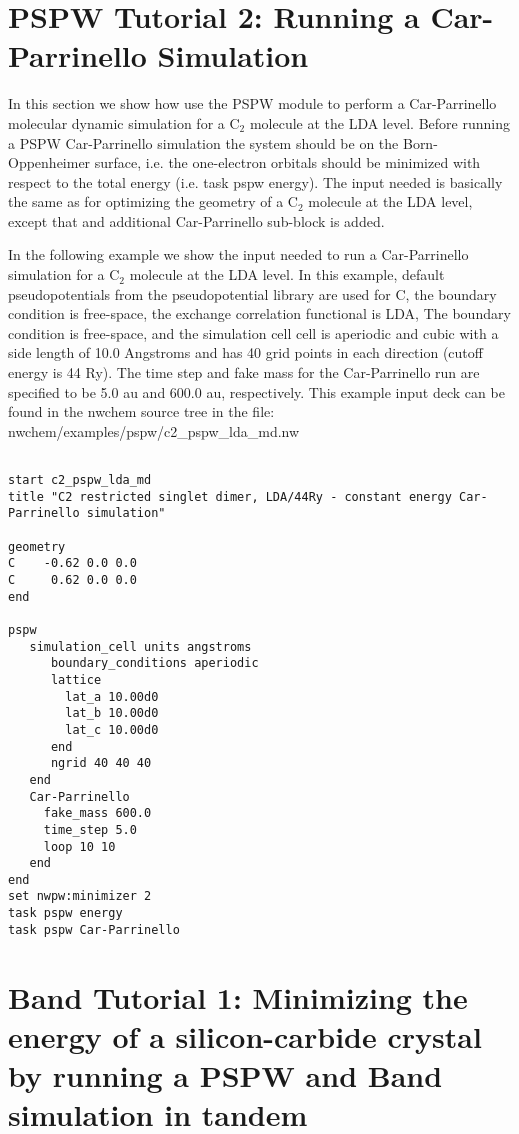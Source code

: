 \normalsize
\section{PSPW Tutorial 2: Running a Car-Parrinello Simulation}
\label{sec:pspw_cp}
\normalsize

In this section we show how use the PSPW module to perform a Car-Parrinello
molecular dynamic simulation for a C$_2$ molecule at the LDA level.  
Before running a PSPW Car-Parrinello  simulation the system should be
on the Born-Oppenheimer surface, i.e. the one-electron orbitals should be minimized 
with respect to the total energy (i.e. task pspw energy).  The input needed
is basically the same as for optimizing the geometry of a C$_2$ molecule at the LDA level,
except that and additional Car-Parrinello sub-block is added.  

In the following example we show the input needed to run a Car-Parrinello simulation
for a C$_2$ molecule at the LDA level.  In this example, default pseudopotentials
from the pseudopotential library are used for C, the boundary condition is free-space, 
the exchange correlation functional is LDA, The boundary condition is free-space, and 
the simulation cell cell is aperiodic and cubic with a side length of 10.0 Angstroms and has
40 grid points in each direction (cutoff energy is 44 Ry).  The time step and fake mass
for the Car-Parrinello run are specified to be 5.0 au and 600.0 au, respectively.  
This example input deck can be found in the nwchem source tree in the file: nwchem/examples/pspw/c2\_pspw\_lda\_md.nw

\begin{verbatim}
         
start c2_pspw_lda_md
title "C2 restricted singlet dimer, LDA/44Ry - constant energy Car-Parrinello simulation"

geometry  
C    -0.62 0.0 0.0
C     0.62 0.0 0.0
end
       
pspw
   simulation_cell units angstroms
      boundary_conditions aperiodic
      lattice
        lat_a 10.00d0
        lat_b 10.00d0
        lat_c 10.00d0
      end
      ngrid 40 40 40
   end
   Car-Parrinello
     fake_mass 600.0
     time_step 5.0
     loop 10 10
   end
end
set nwpw:minimizer 2
task pspw energy
task pspw Car-Parrinello
\end{verbatim}



\normalsize
\section{Band Tutorial 1: Minimizing the energy of a silicon-carbide crystal by running a PSPW and Band simulation in tandem}
\label{sec:band_tutorial1}
\normalsize

